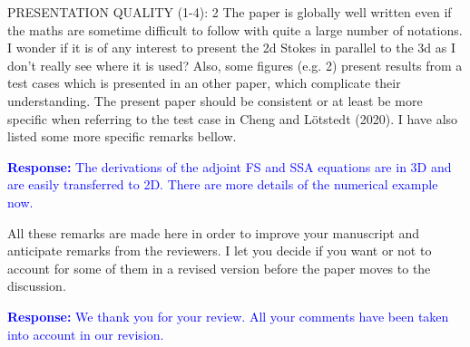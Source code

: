\documentclass{article}
\newcommand{\colorthree}{blue}
\newcommand{\revth}[1]{\noindent \textcolor{\colorthree}{{\bf Response:} #1}}
\begin{document}
{PRESENTATION QUALITY (1-4): 2
The paper is globally well written even if the maths are sometime difficult to follow with quite a large number of notations. I wonder if it is of any interest to present the 2d Stokes in parallel to the 3d as I don’t really see where it is used? Also, some figures (e.g. 2) present results from a test cases which is presented in an other paper, which complicate their understanding. The present paper should be consistent or at least be more specific when referring to the test case in Cheng and L\"otstedt (2020). I have also listed some more specific remarks bellow. 

\revth{The derivations of the adjoint FS and SSA equations are in 3D and are easily transferred to 2D. There are more details of the numerical example now.}

All these remarks are made here in order to improve your manuscript and anticipate remarks from the reviewers. I let you decide if you want or not to account for some of them in a revised version before the paper moves to the discussion.

\revth{We thank you for your review. All your comments have been taken into account in our revision.}
}
\end{document}
